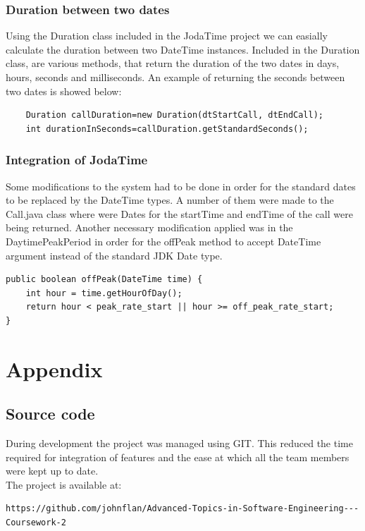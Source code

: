 \documentclass[pdftex,11pt,a4paper]{article}
\begin{document}
\subsubsection{Duration between two dates}
Using the Duration class included in the JodaTime project we can easially calculate the duration between two DateTime instances. Included in the Duration class, are various methods, that return the duration of the two dates in days, hours, seconds and milliseconds. An example of returning the seconds between two dates is showed below:
\begin{lstlisting}
	Duration callDuration=new Duration(dtStartCall, dtEndCall);
	int durationInSeconds=callDuration.getStandardSeconds();
\end{lstlisting}

\subsubsection{Integration of JodaTime}
Some modifications to the system had to be done in order for the standard dates to be replaced by the DateTime types. A number of them were made to the Call.java class where were Dates for the startTime and endTime of the call were being returned. Another necessary modification applied was in the DaytimePeakPeriod in order for the offPeak method to accept DateTime argument instead of the standard JDK Date type.
\begin{lstlisting}
public boolean offPeak(DateTime time) {     
	int hour = time.getHourOfDay();
	return hour < peak_rate_start || hour >= off_peak_rate_start;
}
\end{lstlisting}
\newpage
\section{Appendix}

\subsection{Source code}
During development the project was managed using GIT. This reduced the time required for integration of features and the ease at which all the team members were kept up to date.\\
The project is available at:
\begin{lstlisting}
https://github.com/johnflan/Advanced-Topics-in-Software-Engineering---Coursework-2
\end{lstlisting}
\end{document}
